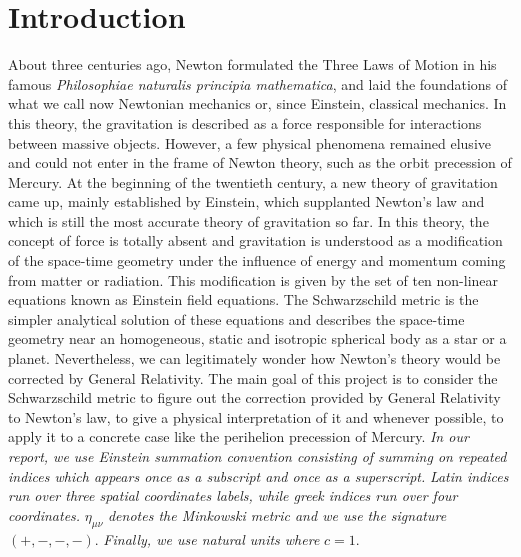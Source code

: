 \section{Introduction}

About three centuries ago, Newton formulated the Three Laws of Motion in his famous
\textit{Philosophiae naturalis principia mathematica}, and laid the foundations of what we
call now Newtonian mechanics or, since Einstein, classical mechanics. In this theory, the gravitation
is described as a force responsible for interactions between massive objects.
However, a few physical phenomena remained elusive and could not enter in the frame of Newton
theory, such as the orbit precession of Mercury. At the beginning of the twentieth century,
a new theory of gravitation came up, mainly established by Einstein, which supplanted Newton’s
law and which is still the most accurate theory of gravitation so far.
In this theory, the concept of force is totally absent and gravitation is understood as a modification
of the space-time geometry under the influence of energy and momentum coming from matter or radiation.
This modification is given by the set of ten non-linear equations known as Einstein field equations.
The Schwarzschild metric is the simpler analytical solution of these equations and describes the space-time geometry
near an homogeneous, static and isotropic spherical body as a star or a planet.
Nevertheless, we can legitimately wonder how Newton’s theory would be corrected by General Relativity.
The main goal of this project is to consider the Schwarzschild metric to figure out the correction provided by General
Relativity to Newton’s law, to give a physical interpretation of it and whenever possible,
to apply it to a concrete case like the perihelion precession of Mercury.\newline\newline
%
\textit{In our report, we use Einstein summation convention consisting of summing
on repeated indices which appears once as a subscript and once as a superscript.}\newline
\textit{Latin indices run over three spatial coordinates labels, while greek indices run
over four coordinates.}\newline
$\eta_{\mu\nu}$\textit{ denotes the Minkowski metric and we use the signature} $(+,-,-,-)$.\newline
\textit{Finally, we use natural units where }$c=1$.